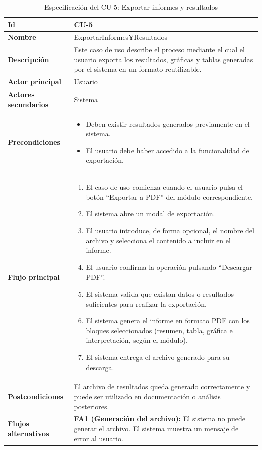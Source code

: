 \begin{longtable}{|p{4cm}|p{10cm}|}
\caption{Especificación del CU-5: Exportar informes y resultados}
\label{tab:esp_cu5}\\
\hline
\textbf{Id} & CU-5 \\ \hline
\textbf{Nombre} & ExportarInformesYResultados \\ \hline

\textbf{Descripción} & 
Este caso de uso describe el proceso mediante el cual el usuario exporta los resultados, gráficas y tablas generadas por el sistema en un formato reutilizable. \\ \hline

\textbf{Actor principal} & Usuario \\ \hline
\textbf{Actores secundarios} & Sistema \\ \hline

\textbf{Precondiciones} & 
\begin{itemize}
    \item Deben existir resultados generados previamente en el sistema.
    \item El usuario debe haber accedido a la funcionalidad de exportación.
\end{itemize} \\ \hline

\textbf{Flujo principal} & 
\begin{enumerate}
    \item El caso de uso comienza cuando el usuario pulsa el botón ``Exportar a PDF'' del módulo correspondiente.
    
    \item El sistema abre un modal de exportación.
    
    \item El usuario introduce, de forma opcional, el nombre del archivo y selecciona el contenido a incluir en el informe.
    
    \item El usuario confirma la operación pulsando ``Descargar PDF''.
    
    \item El sistema valida que existan datos o resultados suficientes para realizar la exportación.
    
    \item El sistema genera el informe en formato PDF con los bloques seleccionados (resumen, tabla, gráfica e interpretación, según el módulo).
    
    \item El sistema entrega el archivo generado para su descarga.
\end{enumerate} \\ \hline

\textbf{Postcondiciones} & 
El archivo de resultados queda generado correctamente y puede ser utilizado en documentación o análisis posteriores. \\ \hline

\textbf{Flujos alternativos} & 
\textbf{FA1 (Generación del archivo):} El sistema no puede generar el archivo. El sistema muestra un mensaje de error al usuario. \\ \hline

\end{longtable}
